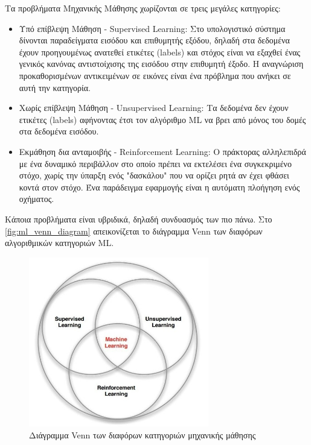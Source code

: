 Τα προβλήματα Μηχανικής Μάθησης χωρίζονται σε τρεις μεγάλες κατηγορίες:
\begin{itemize}
  \item{Υπό επίβλεψη Μάθηση - Supervised Learning:
      Στο υπολογιστικό σύστημα δίνονται παραδείγματα εισόδου και επιθυμητής εξόδου,
      δηλαδή στα δεδομένα έχουν προηγουμένως ανατεθεί ετικέτες (labels)
      και στόχος είναι να εξαχθεί ένας γενικός κανόνας αντιστοίχισης της εισόδου στην επιθυμητή έξοδο.
      Η αναγνώριση προκαθορισμένων αντικειμένων σε εικόνες είναι ένα πρόβλημα που ανήκει 
      σε αυτή την κατηγορία.
    }
  \item{Χωρίς επίβλεψη Μάθηση - Unsupervised Learning:
      Τα δεδομένα δεν έχουν ετικέτες (labels) αφήνοντας έτσι τον αλγόριθμο ML να βρει
      από μόνος του δομές στα δεδομένα εισόδου.
    }
  \item{Εκμάθηση δια ανταμοιβής - Reinforcement Learning:
      Ο πράκτορας αλληλεπιδρά με ένα δυναμικό περιβάλλον στο οποίο πρέπει να
      εκτελέσει ένα συγκεκριμένο στόχο, χωρίς την ύπαρξη ενός "δασκάλου" που να
      ορίζει ρητά αν έχει φθάσει κοντά στον στόχο. Ένα παράδειγμα εφαρμογής
      είναι η αυτόματη πλοήγηση ενός οχήματος.
    }
\end{itemize}
Kάποια προβλήματα είναι υβριδικά, δηλαδή συνδυασμός των πιο πάνω.
Στο \autoref{fig:ml_venn_diagram} απεικονίζεται το διάγραμμα Venn των διαφόρων 
αλγοριθμικών κατηγοριών ML.
\begin{figure}[!ht]
  \centering
  \includegraphics[width=0.7\textwidth]{./images/chapter3/ml_venn_diagram.jpg}
  \caption[Διάγραμμα Venn των διαφόρων κατηγοριών μηχανικής μάθησης]{Διάγραμμα Venn των διαφόρων κατηγοριών μηχανικής μάθησης}
  \label{fig:ml_venn_diagram}
\end{figure}

